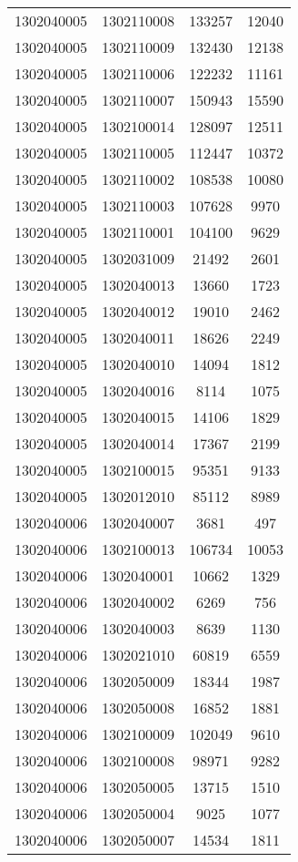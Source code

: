 \begin{longtable}[h]{llcc}
		1302040005 & 1302110008 & 133257 & 12040\\
		1302040005 & 1302110009 & 132430 & 12138\\
		1302040005 & 1302110006 & 122232 & 11161\\
		1302040005 & 1302110007 & 150943 & 15590\\
		1302040005 & 1302100014 & 128097 & 12511\\
		1302040005 & 1302110005 & 112447 & 10372\\
		1302040005 & 1302110002 & 108538 & 10080\\
		1302040005 & 1302110003 & 107628 & 9970\\
		1302040005 & 1302110001 & 104100 & 9629\\
		1302040005 & 1302031009 & 21492 & 2601\\
		1302040005 & 1302040013 & 13660 & 1723\\
		1302040005 & 1302040012 & 19010 & 2462\\
		1302040005 & 1302040011 & 18626 & 2249\\
		1302040005 & 1302040010 & 14094 & 1812\\
		1302040005 & 1302040016 & 8114 & 1075\\
		1302040005 & 1302040015 & 14106 & 1829\\
		1302040005 & 1302040014 & 17367 & 2199\\
		1302040005 & 1302100015 & 95351 & 9133\\
		1302040005 & 1302012010 & 85112 & 8989\\
		1302040006 & 1302040007 & 3681 & 497\\
		1302040006 & 1302100013 & 106734 & 10053\\
		1302040006 & 1302040001 & 10662 & 1329\\
		1302040006 & 1302040002 & 6269 & 756\\
		1302040006 & 1302040003 & 8639 & 1130\\
		1302040006 & 1302021010 & 60819 & 6559\\
		1302040006 & 1302050009 & 18344 & 1987\\
		1302040006 & 1302050008 & 16852 & 1881\\
		1302040006 & 1302100009 & 102049 & 9610\\
		1302040006 & 1302100008 & 98971 & 9282\\
		1302040006 & 1302050005 & 13715 & 1510\\
		1302040006 & 1302050004 & 9025 & 1077\\
		1302040006 & 1302050007 & 14534 & 1811\\

\end{longtable}
